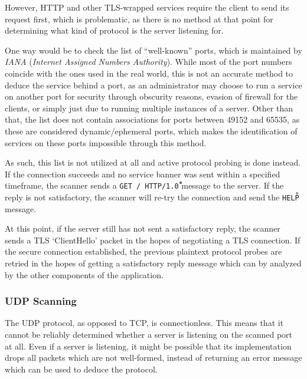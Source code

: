 \documentclass[a4paper,12pt]{article}
\begin{document}
	However, HTTP and other TLS-wrapped services require the client to send its request first, which is problematic, as there is no method at that point for determining what kind of protocol is the server listening for.
	
	One way would be to check the list of ``well-known'' ports\cite{iana16}, which is maintained by \textit{IANA} (\textit{Internet Assigned Numbers Authority}). While most of the port numbers coincide with the ones used in the real world, this is not an accurate method to deduce the service behind a port, as an administrator may choose to run a service on another port for security through obscurity reasons, evasion of firewall for the clients, or simply just due to running multiple instances of a server. Other than that, the list does not contain associations for ports between 49152 and 65535, as these are considered dynamic/ephemeral ports, which makes the identification of services on these ports impossible through this method.
	
	As such, this list is not utilized at all and active protocol probing is done instead. If the connection succeeds and no service banner was sent within a specified timeframe, the scanner sends a \texttt{GET / HTTP/1.0}\texttt{\r\n\r\n} message to the server. If the reply is not satisfactory, the scanner will re-try the connection and send the \texttt{HELP\r\n} message.
	
	At this point, if the server still has not sent a satisfactory reply, the scanner sends a TLS `ClientHello' packet in the hopes of negotiating a TLS connection. If the secure connection established, the previous plaintext protocol probes are retried in the hopes of getting a satisfactory reply message which can by analyzed by the other components of the application.

\subsubsection{UDP Scanning} \label{udpscan}
 

	The UDP protocol, as opposed to TCP, is connectionless. This means that it cannot be reliably determined whether a server is listening on the scanned port at all. Even if a server is listening, it might be possible that its implementation drops all packets which are not well-formed, instead of returning an error message which can be used to deduce the protocol.
	
\end{document}
